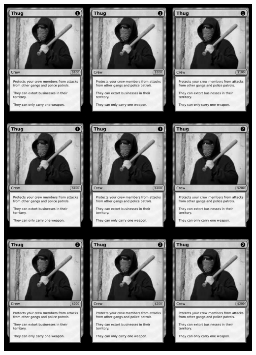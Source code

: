 \documentclass[a4paper]{article}
\begin{document}
\begin{center}
	\centering
	\includegraphics[width=190.5mm,height=266.7mm]{output/temp/page16.png}
\end{center}

\newpage
\end{document}
